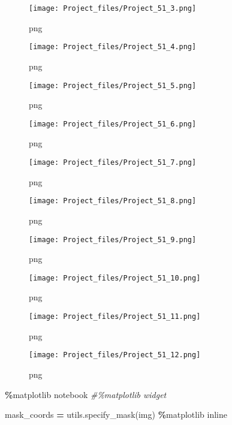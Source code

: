 \documentclass[
]{article}
\newenvironment{Shaded}{\begin{snugshade}}{\end{snugshade}}
\newcommand{\CommentTok}[1]{\textcolor[rgb]{0.56,0.35,0.01}{\textit{#1}}}
\newcommand{\NormalTok}[1]{#1}
\newcommand{\OperatorTok}[1]{\textcolor[rgb]{0.81,0.36,0.00}{\textbf{#1}}}
\begin{document}
\begin{figure}
\centering
\texttt{[image: Project\_files/Project\_51\_3.png]}
\caption{png}
\end{figure}

\begin{figure}
\centering
\texttt{[image: Project\_files/Project\_51\_4.png]}
\caption{png}
\end{figure}

\begin{figure}
\centering
\texttt{[image: Project\_files/Project\_51\_5.png]}
\caption{png}
\end{figure}

\begin{figure}
\centering
\texttt{[image: Project\_files/Project\_51\_6.png]}
\caption{png}
\end{figure}

\begin{figure}
\centering
\texttt{[image: Project\_files/Project\_51\_7.png]}
\caption{png}
\end{figure}

\begin{figure}
\centering
\texttt{[image: Project\_files/Project\_51\_8.png]}
\caption{png}
\end{figure}

\begin{figure}
\centering
\texttt{[image: Project\_files/Project\_51\_9.png]}
\caption{png}
\end{figure}

\begin{figure}
\centering
\texttt{[image: Project\_files/Project\_51\_10.png]}
\caption{png}
\end{figure}

\begin{figure}
\centering
\texttt{[image: Project\_files/Project\_51\_11.png]}
\caption{png}
\end{figure}

\begin{figure}
\centering
\texttt{[image: Project\_files/Project\_51\_12.png]}
\caption{png}
\end{figure}

\begin{Shaded}
\begin{Highlighting}[]
\OperatorTok{\%}\NormalTok{matplotlib notebook}
\CommentTok{\#\%matplotlib widget}

\NormalTok{mask\_coords }\OperatorTok{=}\NormalTok{ utils.specify\_mask(img)}
\OperatorTok{\%}\NormalTok{matplotlib inline }
\end{Highlighting}
\end{Shaded}
\end{document}
